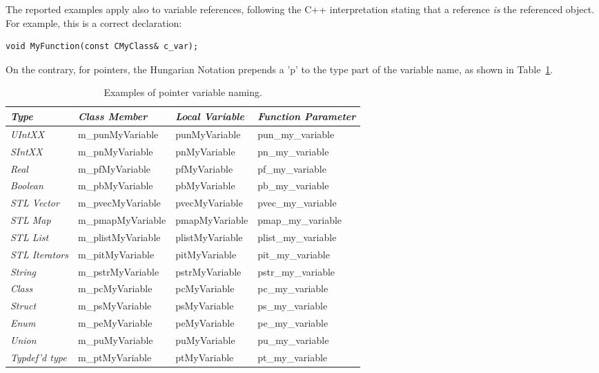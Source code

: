 \documentclass[a4paper]{article}
\begin{document}
The reported examples apply also to variable references, following the C++
interpretation stating that a reference {\it is} the referenced
object. For example, this is a correct declaration:
%
\begin{lstlisting}
void MyFunction(const CMyClass& c_var);
\end{lstlisting}
%
On the contrary, for pointers, the Hungarian Notation prepends a 'p'
to the type part of the variable name, as shown in
Table~\ref{table:pointer_var_naming}.
\begin{table}[t]
  \caption{Examples of pointer variable naming.}
  \label{table:pointer_var_naming}
  \centering
  \begin{footnotesize}
    \begin{tabular}{l l l l}
      \toprule
      {\it Type} & {\it Class Member} & {\it Local Variable} & {\it Function Parameter} \\
      \midrule
      {\it UIntXX} & m\_punMyVariable & punMyVariable & pun\_my\_variable \\
      {\it SIntXX} & m\_pnMyVariable & pnMyVariable & pn\_my\_variable \\
      {\it Real} & m\_pfMyVariable & pfMyVariable & pf\_my\_variable \\
      {\it Boolean} & m\_pbMyVariable & pbMyVariable & pb\_my\_variable \\
      {\it STL Vector} & m\_pvecMyVariable & pvecMyVariable & pvec\_my\_variable \\
      {\it STL Map} & m\_pmapMyVariable & pmapMyVariable & pmap\_my\_variable \\
      {\it STL List} & m\_plistMyVariable & plistMyVariable & plist\_my\_variable \\
      {\it STL Iterators} & m\_pitMyVariable & pitMyVariable & pit\_my\_variable \\
      {\it String} & m\_pstrMyVariable & pstrMyVariable & pstr\_my\_variable \\
      {\it Class} & m\_pcMyVariable & pcMyVariable & pc\_my\_variable \\
      {\it Struct} & m\_psMyVariable & psMyVariable & ps\_my\_variable \\
      {\it Enum} & m\_peMyVariable & peMyVariable & pe\_my\_variable \\
      {\it Union} & m\_puMyVariable & puMyVariable & pu\_my\_variable \\
      {\it Typdef'd type} & m\_ptMyVariable & ptMyVariable & pt\_my\_variable \\
      \bottomrule
    \end{tabular}
  \end{footnotesize}
\end{table}
\end{document}
